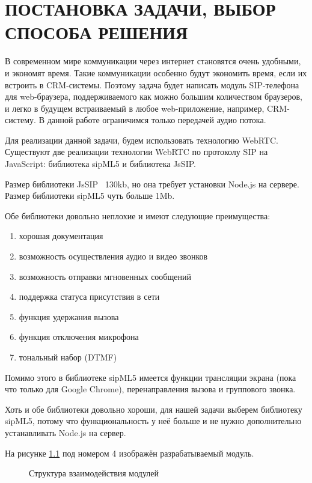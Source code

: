 \chapter{ПОСТАНОВКА ЗАДАЧИ, ВЫБОР СПОСОБА РЕШЕНИЯ}
В современном мире коммуникации через интернет становятся очень удобными, и экономят время. Такие коммуникации особенно будут экономить время, если их встроить в CRM-системы. Поэтому задача будет написать модуль SIP-телефона для web-браузера, поддерживаемого как можно большим количеством браузеров, и легко в будущем встраиваемый в любое web-приложение, например, CRM-систему. В данной работе ограничимся только передачей аудио потока.

Для реализации данной задачи, будем использовать технологию WebRTC. Существуют две реализации технологии WebRTC по протоколу SIP на JavaScript: библиотека sipML5 и библиотека JsSIP.\cite{sipML5}\cite{JsSIP}

Размер библиотеки JsSIP ~130kb, но она требует установки Node.js на сервере. Размер библиотеки sipML5 чуть больше 1Mb.

Обе библиотеки довольно неплохие и имеют следующие преимущества:
\begin{enumerate}
\item хорошая документация
\item возможность осуществления аудио и видео звонков
\item возможность отправки мгновенных сообщений
\item поддержка статуса присутствия в сети
\item функция удержания вызова
\item функция отключения микрофона
\item тональный набор (DTMF)
\end{enumerate}

Помимо этого в библиотеке sipML5 имеется функции трансляции экрана (пока что только для Google Chrome), перенаправления вызова и группового звонка.

Хоть и обе библиотеки довольно хороши, для нашей задачи выберем библиотеку sipML5, потому что функциональность у неё больше и не нужно дополнительно устанавливать Node.js на сервер.

На рисунке \ref{image:modulesStructure} под номером 4 изображён разрабатываемый модуль.

\begin{figure}[h!]
\caption{Структура взаимодействия модулей}
\label{image:modulesStructure}
\end{figure}